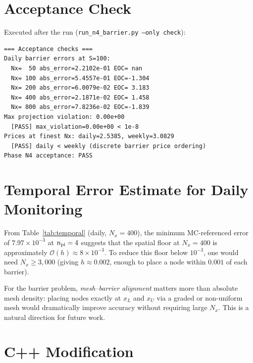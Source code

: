 \documentclass[11pt,a4paper]{article}
\newcommand{\Nx}{N_x}
\newcommand{\npi}{n_{\rm pi}}
\newcommand{\bigo}[1]{\mathcal{O}(#1)}
\begin{document}
\appendix
\section{Acceptance Check}
\label{app:acceptance}

Executed after the run (\texttt{run\_n4\_barrier.py --only check}):
{\small\begin{verbatim}
=== Acceptance checks ===
Daily barrier errors at S=100:
  Nx=  50 abs_error=2.2102e-01 EOC= nan
  Nx= 100 abs_error=5.4557e-01 EOC=-1.304
  Nx= 200 abs_error=6.0079e-02 EOC= 3.183
  Nx= 400 abs_error=2.1871e-02 EOC= 1.458
  Nx= 800 abs_error=7.8236e-02 EOC=-1.839
Max projection violation: 0.00e+00
  [PASS] max_violation=0.00e+00 < 1e-8
Prices at finest Nx: daily=2.5385, weekly=3.0829
  [PASS] daily < weekly (discrete barrier price ordering)
Phase N4 acceptance: PASS
\end{verbatim}}

\section{Temporal Error Estimate for Daily Monitoring}
\label{app:temporal}

From Table~\ref{tab:temporal} (daily, $\Nx=400$), the minimum
MC-referenced error of $7.97\times10^{-3}$ at $\npi = 4$ suggests that
the spatial floor at $\Nx = 400$ is approximately
$\bigo{h} \approx 8\times10^{-3}$.
To reduce this floor below $10^{-3}$, one would need $\Nx \ge 3{,}000$
(giving $h \approx 0.002$, enough to place a node within $0.001$
of each barrier).

For the barrier problem, \emph{mesh--barrier alignment} matters more
than absolute mesh density: placing nodes exactly at $x_L$ and $x_U$
via a graded or non-uniform mesh would dramatically improve accuracy
without requiring large $\Nx$.  This is a natural direction for future
work.

\section{C++ Modification}
\label{app:cpp}
\end{document}
